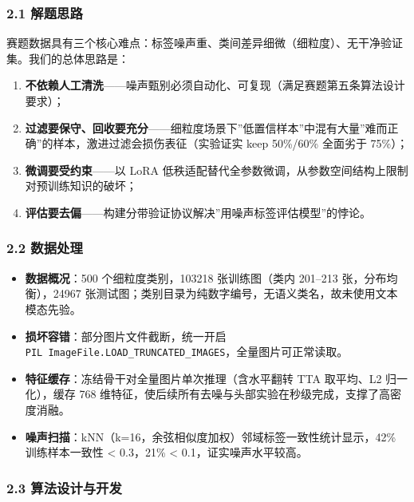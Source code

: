 \documentclass[
]{article}
\providecommand{\tightlist}{%
  \setlength{\itemsep}{0pt}\setlength{\parskip}{0pt}}
\begin{document}
\subsubsection{2.1 解题思路}\label{ux89e3ux9898ux601dux8def}

赛题数据具有三个核心难点：标签噪声重、类间差异细微（细粒度）、无干净验证集。我们的总体思路是：

\begin{enumerate}
\def\labelenumi{\arabic{enumi}.}
\tightlist
\item
  \textbf{不依赖人工清洗}------噪声甄别必须自动化、可复现（满足赛题第五条算法设计要求）；
\item
  \textbf{过滤要保守、回收要充分}------细粒度场景下''低置信样本''中混有大量''难而正确''的样本，激进过滤会损伤表征（实验证实
  keep 50\%/60\% 全面劣于 75\%）；
\item
  \textbf{微调要受约束}------以 LoRA
  低秩适配替代全参数微调，从参数空间结构上限制对预训练知识的破坏；
\item
  \textbf{评估要去偏}------构建分带验证协议解决''用噪声标签评估模型''的悖论。
\end{enumerate}

\subsubsection{2.2 数据处理}\label{ux6570ux636eux5904ux7406}

\begin{itemize}
\tightlist
\item
  \textbf{数据概况}：500 个细粒度类别，103218 张训练图（类内 201--213
  张，分布均衡），24967
  张测试图；类别目录为纯数字编号，无语义类名，故未使用文本模态先验。
\item
  \textbf{损坏容错}：部分图片文件截断，统一开启
  \texttt{PIL\ ImageFile.LOAD\_TRUNCATED\_IMAGES}，全量图片可正常读取。
\item
  \textbf{特征缓存}：冻结骨干对全量图片单次推理（含水平翻转 TTA
  取平均、L2 归一化），缓存 768
  维特征，使后续所有去噪与头部实验在秒级完成，支撑了高密度消融。
\item
  \textbf{噪声扫描}：kNN（k=16，余弦相似度加权）邻域标签一致性统计显示，42\%
  训练样本一致性 \textless{} 0.3，21\% \textless{}
  0.1，证实噪声水平较高。
\end{itemize}

\subsubsection{2.3
算法设计与开发}\label{ux7b97ux6cd5ux8bbeux8ba1ux4e0eux5f00ux53d1}
\end{document}
